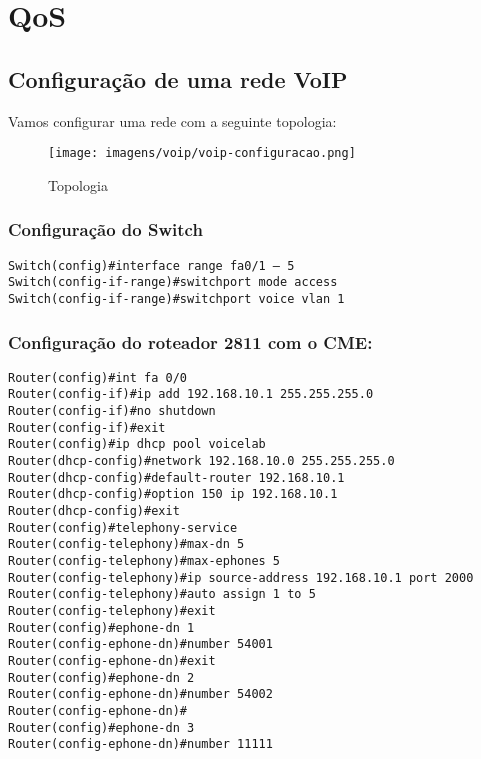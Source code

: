 \documentclass[]{article}
\begin{document}
\hypertarget{qos}{%
\section{QoS}\label{qos}}

\hypertarget{configurauxe7uxe3o-de-uma-rede-voip}{%
\subsection{Configuração de uma rede
VoIP}\label{configurauxe7uxe3o-de-uma-rede-voip}}

Vamos configurar uma rede com a seguinte topologia:

\begin{figure}
\centering
\texttt{[image: imagens/voip/voip-configuracao.png]}
\caption{Topologia}
\end{figure}

\hypertarget{configurauxe7uxe3o-do-switch}{%
\subsubsection{Configuração do
Switch}\label{configurauxe7uxe3o-do-switch}}

\begin{verbatim}
Switch(config)#interface range fa0/1 – 5
Switch(config-if-range)#switchport mode access
Switch(config-if-range)#switchport voice vlan 1
\end{verbatim}

\hypertarget{configurauxe7uxe3o-do-roteador-2811-com-o-cme}{%
\subsubsection{Configuração do roteador 2811 com o
CME:}\label{configurauxe7uxe3o-do-roteador-2811-com-o-cme}}

\begin{verbatim}
Router(config)#int fa 0/0
Router(config-if)#ip add 192.168.10.1 255.255.255.0
Router(config-if)#no shutdown
Router(config-if)#exit
Router(config)#ip dhcp pool voicelab
Router(dhcp-config)#network 192.168.10.0 255.255.255.0
Router(dhcp-config)#default-router 192.168.10.1
Router(dhcp-config)#option 150 ip 192.168.10.1
Router(dhcp-config)#exit
Router(config)#telephony-service
Router(config-telephony)#max-dn 5
Router(config-telephony)#max-ephones 5
Router(config-telephony)#ip source-address 192.168.10.1 port 2000
Router(config-telephony)#auto assign 1 to 5
Router(config-telephony)#exit
Router(config)#ephone-dn 1
Router(config-ephone-dn)#number 54001
Router(config-ephone-dn)#exit
Router(config)#ephone-dn 2
Router(config-ephone-dn)#number 54002
Router(config-ephone-dn)#
Router(config)#ephone-dn 3
Router(config-ephone-dn)#number 11111
\end{verbatim}
\end{document}
